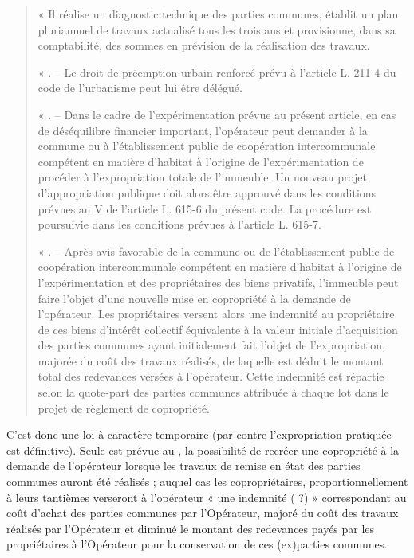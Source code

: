 \begin{quote}
			« Il réalise un diagnostic technique des parties communes, établit un plan
			pluriannuel de travaux actualisé tous les trois ans et provisionne, dans sa comptabilité,
			des sommes en prévision de la réalisation des travaux.
			
			\medskip
			« \IV. – Le droit de préemption urbain renforcé prévu à l’article L. 211-4 du code de
			l’urbanisme peut lui être délégué.
			
			\medskip
			« \V. – Dans le cadre de l’expérimentation prévue au présent article, en cas de déséquilibre
			financier important, l’opérateur peut demander à la commune ou à l’établissement
			public de coopération intercommunale compétent en matière d’habitat à l’origine de
			l’expérimentation de procéder à l’expropriation totale de l’immeuble. Un nouveau
			projet d’appropriation publique doit alors être approuvé dans les conditions prévues
			au V de l’article L. 615-6 du présent code. La procédure est poursuivie dans les
			conditions prévues à l’article L. 615-7.
			
			\medskip
			« \VI. – Après avis favorable de la commune ou de l’établissement public de coopération
			intercommunale compétent en matière d’habitat à l’origine de l’expérimentation et des
			propriétaires des biens privatifs, l’immeuble peut faire l’objet d’une nouvelle mise en
			copropriété à la demande de l’opérateur. Les propriétaires versent alors une indemnité
			au propriétaire de ces biens d’intérêt collectif équivalente à la valeur initiale
			d’acquisition des parties communes ayant initialement fait l’objet de l’expropriation,
			majorée du coût des travaux réalisés, de laquelle est déduit le montant total des
			redevances versées à l’opérateur. Cette indemnité est répartie selon la quote-part des
			parties communes attribuée à chaque lot dans le projet de règlement de copropriété.
		\end{quote}
		
		C’est donc une loi à caractère temporaire (par contre l’expropriation pratiquée est définitive). Seule est
		prévue au \VI, la possibilité de recréer une copropriété à la demande de l’opérateur lorsque les travaux de
		remise en état des parties communes auront été réalisés ; auquel cas les copropriétaires,
		proportionnellement à leurs tantièmes verseront à l’opérateur « une indemnité ( ?) » correspondant au
		coût d’achat des parties communes par l’Opérateur, majoré du coût des travaux réalisés par l’Opérateur
		et diminué le montant des redevances payés par les propriétaires à l’Opérateur pour la conservation de
		ces (ex)parties communes.
		
